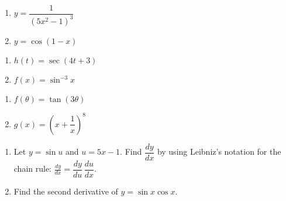 \documentclass[11pt]{article}
\newcommand{\ds}{\displaystyle}
\begin{document}
\noindent
\begin{multicols}{2}
\begin{enumerate}
\setcounter{enumi}{\theenumCount}
\item $y = \dfrac{1}{(5x^2 - 1)^3}$
\item $y = \cos(1-x)$
\setcounter{enumCount}{\theenumi}
\end{enumerate}
\end{multicols}
\vfill

\newpage
\noindent
\begin{multicols}{2}
\begin{enumerate}
\setcounter{enumi}{\theenumCount}
\item $h(t) = \sec(4t+3)$
\item $f(x) = \sin^{-3} x$
\setcounter{enumCount}{\theenumi}
\end{enumerate}
\end{multicols}
\vfill

\noindent
\begin{multicols}{2}
\begin{enumerate}
\setcounter{enumi}{\theenumCount}
\item $f(\theta) = \tan(3\theta)$
\item $\ds g(x) = \left( x + \dfrac{1}{x} \right)^8$
\setcounter{enumCount}{\theenumi}
\end{enumerate}
\end{multicols}
\vfill

\begin{enumerate}
\setcounter{enumi}{\theenumCount}
\item Let $y = \sin u$ and $u = 5x - 1$.  Find $\dfrac{dy}{dx}$ by using Leibniz's notation for the chain rule: $\ds \frac{dy}{dx} = \dfrac{dy}{du} \, \dfrac{du}{dx}$. 
\vfill

\item Find the second derivative of $y = \sin x \cos x$.
\vfill


\setcounter{enumCount}{\theenumi}
\end{enumerate}
\end{document}

